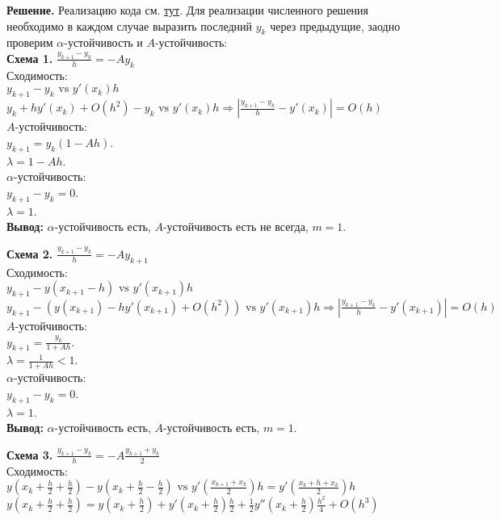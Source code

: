 \documentclass[14pt,a4paper]{extarticle}
\newcommand{\1}{\mathbbm{1}}
\begin{document}
\textbf{Решение.} 
Реализацию кода см. \href{https://github.com/VsevolodZaostrovsky/NumericalMethods/tree/main/Differential%20Equations/Code/src}{тут}. 
Для реализации численного решения необходимо в каждом случае выразить последний $y_k$ через предыдущие, заодно проверим 
$\alpha$-устойчивость и $A$-устойчивость: \\
\textbf{Схема 1.} $\frac{y_{k+1}-y_k}{h}= - A y_k $ \\
    Сходимость:\\ $y_{k+1}-y_k \text{ vs } y'(x_k) h $\\ 
    $y_{k} + h y'(x_k) + O(h^2) - y_k \text{ vs } y'(x_k) h \Rightarrow {|\frac{y_{k+1}-y_k}{h} - y'(x_k)| = O(h)}$ \\
    $A$-устойчивость:\\ $y_{k+1} = y_k (1 - Ah)$. \\
    $\lambda = 1 - A h$. \\
    $\alpha$-устойчивость:\\ $y_{k+1} - y_k = 0$. \\
    $\lambda = 1$. \\
\textbf{Вывод:} $\alpha$-устойчивость есть, $A$-устойчивость есть не всегда, $m=1$.
\par
\textbf{Схема 2.} $\frac{y_{k+1}-y_k}{h} = -A y_{k+1}$ \\ 
Сходимость:\\
$y_{k+1}-y(x_{k+1} - h) \text{ vs } y'(x_{k+1}) h $\\ 
$y_{k+1} -( y(x_{k+1}) - h y'(x_{k+1}) + O(h^2)) \text{ vs } y'(x_{k+1}) h \Rightarrow {|\frac{y_{k+1}-y_k}{h} - y'(x_{k+1})| = O(h)}$ \\ 
$A$-устойчивость:\\ 
$y_{k+1} = \frac{y_k}{1 + Ah} $.\\
$\lambda = \frac{1}{1 + Ah} < 1$. \\
$\alpha$-устойчивость:\\ $y_{k+1} - y_k = 0$. \\
$\lambda = 1$. \\
\textbf{Вывод:} $\alpha$-устойчивость есть, $A$-устойчивость есть, $m=1$.
\par
\textbf{Схема 3.} $\frac{y_{k+1}-y_k}{h} = -A \frac{y_{k+1}+y_k}{2} $\\ 
Сходимость:\\
$y(x_k + \frac{h}{2} + \frac{h}{2}) - y(x_k + \frac{h}{2} - \frac{h}{2}) \text{ vs } y'(\frac{x_{k+1} + x_k}{2}) h = y'(\frac{x_{k} + h + x_k}{2}) h$\\ 
$y(x_k + \frac{h}{2} + \frac{h}{2}) = y(x_k + \frac{h}{2}) + y'(x_k + \frac{h}{2}) \frac{h}{2} + \frac{1}{2} y''(x_k + \frac{h}{2}) \frac{h^2}{4} + O(h^3)$\\
\end{document}
